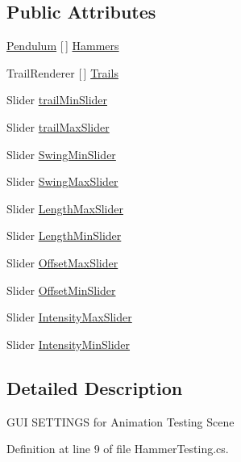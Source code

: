 \subsection*{Public Attributes}
\begin{DoxyCompactItemize}
\item 
\mbox{\hyperlink{class_pendulum}{Pendulum}} \mbox{[}$\,$\mbox{]} \mbox{\hyperlink{class_hammer_testing_a8e1aff0d944d99a264e9e20a1f813fd6}{Hammers}}
\item 
Trail\+Renderer \mbox{[}$\,$\mbox{]} \mbox{\hyperlink{class_hammer_testing_a1e00270a486d1726c36ac96a659567b9}{Trails}}
\item 
Slider \mbox{\hyperlink{class_hammer_testing_aac5b10cc4e17df2ce8f7d00356c12fdc}{trail\+Min\+Slider}}
\item 
Slider \mbox{\hyperlink{class_hammer_testing_a4d583c76ece34807491e006d1349c9c9}{trail\+Max\+Slider}}
\item 
Slider \mbox{\hyperlink{class_hammer_testing_a5d2835941d3290487da9e1b8cf70b94a}{Swing\+Min\+Slider}}
\item 
Slider \mbox{\hyperlink{class_hammer_testing_af7c7894745f51c938ebf1f5bb030e304}{Swing\+Max\+Slider}}
\item 
Slider \mbox{\hyperlink{class_hammer_testing_a8c3b0e8d4e84e3053a66abfebbc4d0c1}{Length\+Max\+Slider}}
\item 
Slider \mbox{\hyperlink{class_hammer_testing_a978596a3342162e9bbee44ad80bb42fa}{Length\+Min\+Slider}}
\item 
Slider \mbox{\hyperlink{class_hammer_testing_a10524c931369a89a1ac20aa9e1923d3b}{Offset\+Max\+Slider}}
\item 
Slider \mbox{\hyperlink{class_hammer_testing_a6521fbc468c4aff8d8b98adfa01566b5}{Offset\+Min\+Slider}}
\item 
Slider \mbox{\hyperlink{class_hammer_testing_a0a86488631345cdef404193c20cfa483}{Intensity\+Max\+Slider}}
\item 
Slider \mbox{\hyperlink{class_hammer_testing_aa005fcfd1058da129139b6072b7e771b}{Intensity\+Min\+Slider}}
\end{DoxyCompactItemize}


\subsection{Detailed Description}
G\+UI S\+E\+T\+T\+I\+N\+GS for Animation Testing Scene 



Definition at line 9 of file Hammer\+Testing.\+cs.



